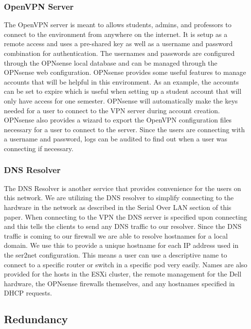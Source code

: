 \documentclass[12pt]{IEEEtran}
\begin{document}
\subsubsection{OpenVPN Server}
The OpenVPN server is meant to allows students, admins, and professors to connect to the environment from anywhere on the internet. 
It is setup as a remote access and uses a pre-shared key as well as a username and password combination for authentication.
The usernames and passwords are configured through the OPNsense local database and can be managed through the OPNsense web configuration.
OPNsense provides some useful features to manage accounts that will be helpful in this environment.
As an example, the accounts can be set to expire which is useful when setting up a student account that will only have access for one semester. 
OPNsense will automatically make the keys needed for a user to connect to the VPN server during account creation. 
OPNsense also provides a wizard to export the OpenVPN configuration files necessary for a user to connect to the server. 
Since the users are connecting with a username and password, logs can be audited to find out when a user was connecting if necessary. 

\subsubsection{DNS Resolver}
The DNS Resolver is another service that provides convenience for the users on this network. 
We are utilizing the DNS resolver to simplify connecting to the hardware in the network as described in the Serial Over LAN section of this paper. 
When connecting to the VPN the DNS server is specified upon connecting and this tells the clients to send any DNS traffic to our resolver. 
Since the DNS traffic is coming to our firewall we are able to resolve hostnames for a local domain.
We use this to provide a unique hostname for each IP address used in the ser2net configuration. 
This means a user can use a descriptive name to connect to a specific router or switch in a specific pod very easily.
Names are also provided for the hosts in the ESXi cluster, the remote management for the Dell hardware, the OPNsense firewalls themselves, and any hostnames specified in DHCP requests.

\subsection{Redundancy}
\end{document}
